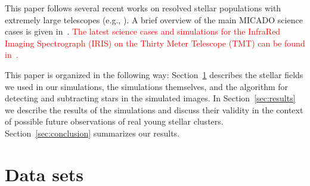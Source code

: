 \documentclass[referee]{aa}
\newcommand{\langedit}[1]{\textcolor{red}{#1}}
\begin{document}
This paper follows several recent works on resolved stellar populations with extremely large telescopes
(e.g., \citealt{deep11, greggio12, gullieuszik15, tolstoy19_iau}).
A brief overview of the main MICADO science cases is given in~\cite{micado2016}.
\langedit{The latest science cases and simulations for the InfraRed Imaging Spectrograph (IRIS) on the Thirty Meter Telescope (TMT) can be found in~\cite{tmt_iris16}.}

This paper is organized in the following way: Section~\ref{sec:observations} describes the stellar fields we used in our simulations, the simulations themselves, and the algorithm for detecting and subtracting stars in the simulated images.
In Section~\ref{sec:results} we describe the results of the simulations and discuss their validity in the context of possible future observations of real young stellar clusters.
Section~\ref{sec:conclusion} summarizes our results.



\section{Data sets}
\label{sec:observations}
\end{document}

